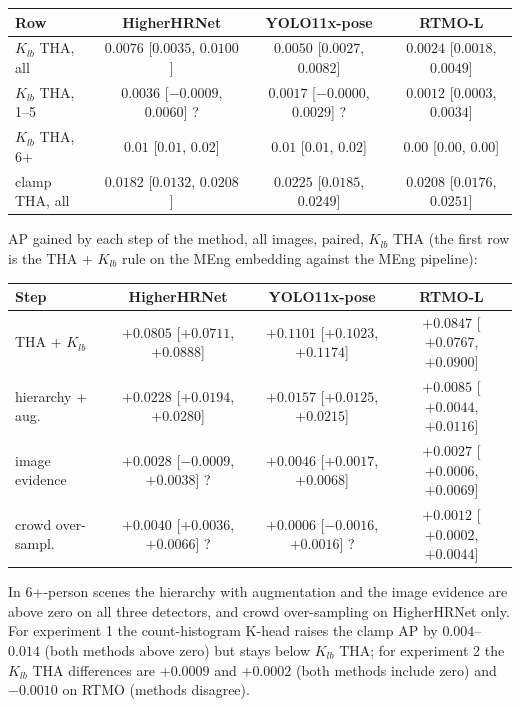 {\small
\begin{tabular}{lccc}
\hline
\textbf{Row} & \textbf{HigherHRNet} & \textbf{YOLO11x-pose} & \textbf{RTMO-L} \\
\hline
$K_{lb}$ THA, all  & $0.0076$ [$0.0035$, $0.0100$] & $0.0050$ [$0.0027$, $0.0082$] & $0.0024$ [$0.0018$, $0.0049$] \\
$K_{lb}$ THA, 1--5 & $0.0036$ [$-0.0009$, $0.0060$] ? & $0.0017$ [$-0.0000$, $0.0029$] ? & $0.0012$ [$0.0003$, $0.0034$] \\
$K_{lb}$ THA, 6+   & $0.01$ [$0.01$, $0.02$] & $0.01$ [$0.01$, $0.02$] & $0.00$ [$0.00$, $0.00$] \\
clamp THA, all     & $0.0182$ [$0.0132$, $0.0208$] & $0.0225$ [$0.0185$, $0.0249$] & $0.0208$ [$0.0176$, $0.0251$] \\
\hline
\end{tabular}
}

\vspace{0.5em}

AP gained by each step of the method, all images, paired, $K_{lb}$ THA (the first row is the THA + $K_{lb}$ rule on the MEng embedding against the MEng pipeline):

{\small\setlength{\tabcolsep}{4pt}
\begin{tabular}{lccc}
\hline
\textbf{Step} & \textbf{HigherHRNet} & \textbf{YOLO11x-pose} & \textbf{RTMO-L} \\
\hline
THA + $K_{lb}$ & $+0.0805$ [$+0.0711$, $+0.0888$] & $+0.1101$ [$+0.1023$, $+0.1174$] & $+0.0847$ [$+0.0767$, $+0.0900$] \\
hierarchy + aug.  & $+0.0228$ [$+0.0194$, $+0.0280$] & $+0.0157$ [$+0.0125$, $+0.0215$] & $+0.0085$ [$+0.0044$, $+0.0116$] \\
image evidence    & $+0.0028$ [$-0.0009$, $+0.0038$] ? & $+0.0046$ [$+0.0017$, $+0.0068$] & $+0.0027$ [$+0.0006$, $+0.0069$] \\
crowd over-sampl. & $+0.0040$ [$+0.0036$, $+0.0066$] ? & $+0.0006$ [$-0.0016$, $+0.0016$] ? & $+0.0012$ [$+0.0002$, $+0.0044$] \\
\hline
\end{tabular}
}

\vspace{0.5em}

In 6+-person scenes the hierarchy with augmentation and the image evidence are above zero on all three detectors, and crowd over-sampling on HigherHRNet only.
For experiment 1 the count-histogram K-head raises the clamp AP by $0.004$--$0.014$ (both methods above zero) but stays below $K_{lb}$ THA; for experiment 2 the $K_{lb}$ THA differences are $+0.0009$ and $+0.0002$ (both methods include zero) and $-0.0010$ on RTMO (methods disagree).

